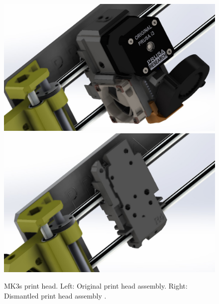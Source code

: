 \begin{figure}[H]
	\centering
	\includegraphics[width=0.4\linewidth]{Figures/og_MK3s_print_head.jpg}
	\hspace{1cm}
	\includegraphics[width=0.4\linewidth]{Figures/dismantled_MK3s_print_head.jpg}
	\caption{MK3s print head. Left: Original print head assembly. Right: Dismantled print head assembly \cite{Kayne2019}.}
	\label{fig:mk3s_head_old_raw}
\end{figure}

